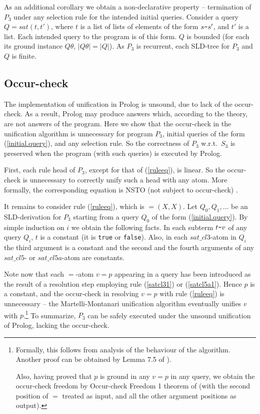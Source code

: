 \documentclass{tlp}
\newcommand*{\mydash}{{\mbox{\tt-}}}
\begin{document}
As an additional corollary we obtain a non-declarative property --
termination of $P_3$ under any selection
rule for the intended initial queries.
 Consider a query
$Q=sat(t,t')$, where 
$t$ is a list of lists of elements of the form  $s\mydash s'$,
and $t'$ is a list.  Each intended query to the program is of this
form.  $Q$ is bounded (for each its ground instance $Q\theta$, $|Q\theta|=|Q|$).
As $P_3$ is recurrent, each SLD-tree for $P_3$ and $Q$ is finite.



\subsection{Occur-check}
\label{sec:occur-check}
The implementation of unification in Prolog is unsound, due to lack of the
occur-check.  As a result, Prolog may produce answers which, according to the
theory, are not answers of the program.
Here we show that 
the occur-check in the unification algorithm is unnecessary
for program $P_3$, initial queries of the form (\ref{initial.query}),
and any selection rule.
So the correctness of $P_3$ w.r.t.\ $S_3$ is preserved when the program (with
such queries) is executed by Prolog.

First, each rule head of $P_3$, except for that of (\ref{ruleeq}), is
linear.
So the occur-check is unnecessary to correctly unify such a head with any atom.
More formally, the corresponding equation is NSTO (not subject to occur-check)
\cite[Lemma 7.5]{Apt-Prolog}.  


It remains to consider rule  (\ref{ruleeq}), which is 
${=}(X,X)$.
Let $Q_0,Q_1,\ldots$ be an SLD-derivation for $P_3$
starting from a query $Q_0$ of the form  (\ref{initial.query}).
By simple induction on $i$ we obtain the following facts.  
In each subterm $t\mydash v$ of any query $Q_i$,
    $t$ is a constant (it is {\tt true} or {\tt false}).  
Also,
in each $sat\_cl3$-atom in $Q_i$ the third argument is a constant
and the second and the fourth arguments of any $sat\_cl5$- or $sat\_cl5a$-atom
are constants.



Note now that each  $=$-atom $v{=}p$ appearing in a query 
has been introduced as the result of a resolution step employing 
rule (\ref{satcl31}) or (\ref{satcl5a1}).
Hence $p$ is a constant, and the occur-check in resolving $v{=}p$  with rule
(\ref{ruleeq}) is unnecessary
-- the Martelli-Montanari unification algorithm eventually unifies $v$ with $p$.\footnote{Formally, this follows from analysis of the behaviour of the algorithm.
    Another proof can be obtained
by Lemma 7.5 of \cite{Apt-Prolog}).

    Also, having proved that $p$ is ground in any $v{=}p$ in any query,
we obtain the occur-check freedom by
    Occur-check Freedom 1 theorem of
    \cite{AptL95.delays} (with the second position of $=$ treated as input,
    and all the other argument positions as output).
} To summarize, $P_3$ can be safely executed under the unsound unification of
Prolog, lacking the occur-check.
\end{document}
